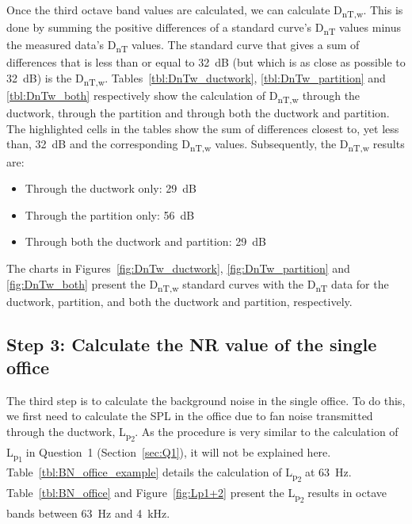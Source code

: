 

Once the third octave band values are calculated, we can calculate D\textsubscript{nT,w}.
This is done by summing the positive differences of a standard curve's D\textsubscript{nT} values minus the measured data's D\textsubscript{nT} values.
The standard curve that gives a sum of differences that is less than or equal to 32~dB (but which is as close as possible to 32~dB) is the D\textsubscript{nT,w}.
Tables~\ref{tbl:DnTw_ductwork}, \ref{tbl:DnTw_partition} and \ref{tbl:DnTw_both} respectively show the calculation of D\textsubscript{nT,w} through the ductwork, through the partition and through both the ductwork and partition.
The highlighted cells in the tables show the sum of differences closest to, yet less than, 32~dB and the corresponding D\textsubscript{nT,w} values.
Subsequently, the D\textsubscript{nT,w} results are:
\begin{itemize}
	\item Through the ductwork only: 29~dB
	\item Through the partition only: 56~dB
	\item Through both the ductwork and partition: 29~dB
\end{itemize}

The charts in Figures~\ref{fig:DnTw_ductwork}, \ref{fig:DnTw_partition} and \ref{fig:DnTw_both} present the D\textsubscript{nT,w} standard curves with the D\textsubscript{nT} data for the ductwork, partition, and both the ductwork and partition, respectively.















\newpage
\subsection{Step 3: Calculate the NR value of the single office} \label{sec:Q4.3}

The third step is to calculate the background noise in the single office.
To do this, we first need to calculate the SPL in the office due to fan noise transmitted through the ductwork, L\textsubscript{p\textsubscript{2}}.
As the procedure is very similar to the calculation of L\textsubscript{p\textsubscript{1}} in Question~1 (Section~\ref{sec:Q1}), it will not be explained here.
Table~\ref{tbl:BN_office_example} details the calculation of L\textsubscript{p\textsubscript{2}} at 63~Hz.
Table~\ref{tbl:BN_office} and Figure~\ref{fig:Lp1+2} present the L\textsubscript{p\textsubscript{2}} results in octave bands between 63~Hz and 4~kHz.

